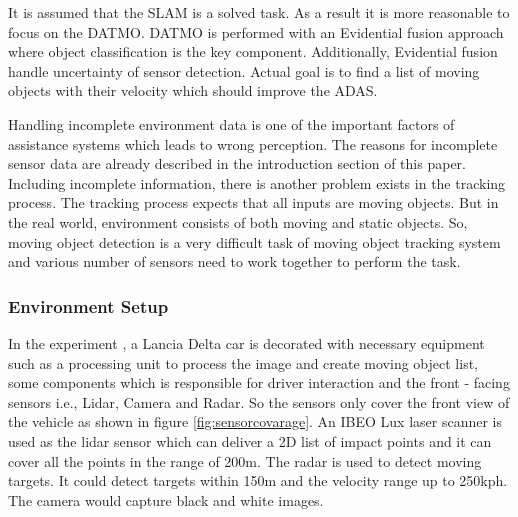 It is assumed that the SLAM is a solved task. As a result it is more reasonable to focus on the DATMO\cite{Chavez_Garcia_2016}. DATMO is performed with an Evidential fusion approach where object classification is the key component. Additionally, Evidential fusion handle uncertainty of sensor detection. Actual goal is to find a list of moving objects with their velocity which should improve the ADAS.

Handling incomplete environment data is one of the important factors of assistance systems which leads to wrong perception. The reasons for incomplete sensor data are already described in the introduction section of this paper. Including incomplete information, there is another problem exists in the tracking process. The tracking process expects that all inputs are moving objects. But in the real world, environment consists of both moving and static objects. So, moving object detection is a very difficult task of moving object tracking system and various number of sensors need to work together to perform the task.

\subsubsection{Environment Setup}
In the experiment \cite{Chavez_Garcia_2016}, a Lancia Delta car is decorated with necessary equipment such as a processing unit to process the image and create moving object list, some components which is responsible for driver interaction and the front - facing sensors i.e., Lidar, Camera and Radar. So the sensors only cover the front view of the vehicle as shown in figure \ref{fig:sensorcovarage}. An IBEO Lux laser scanner is used as the lidar sensor which can deliver a 2D list of impact points and it can cover all the points in the range of 200m. The radar is used to detect moving targets. It could detect targets within 150m and the velocity range up to 250kph. The camera would capture black and white images.

